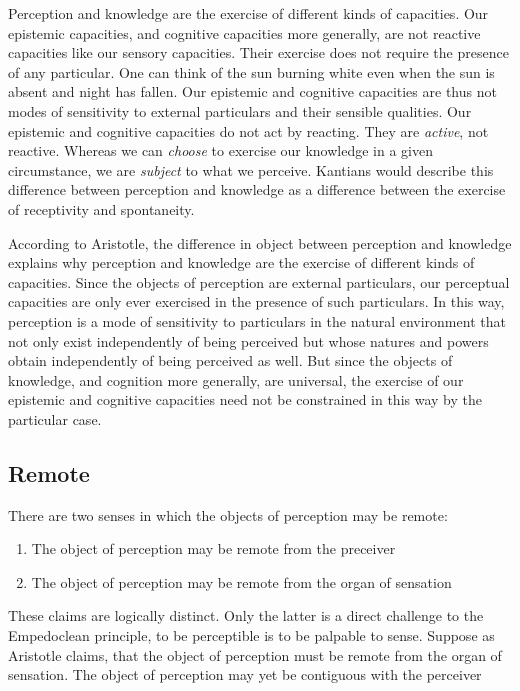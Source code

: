 Perception and knowledge are the exercise of different kinds of capacities. Our epistemic capacities, and cognitive capacities more generally, are not reactive capacities like our sensory capacities. Their exercise does not require the presence of any particular. One can think of the sun burning white even when the sun is absent and night has fallen. Our epistemic and cognitive capacities are thus not modes of sensitivity to external particulars and their sensible qualities. Our epistemic and cognitive capacities do not act by reacting. They are \emph{active}, not reactive. Whereas we can \emph{choose} to exercise our knowledge in a given circumstance, we are \emph{subject} to what we perceive. Kantians would describe this difference between perception and knowledge as a difference between the exercise of receptivity and spontaneity.

According to Aristotle, the difference in object between perception and know\-ledge explains why perception and knowledge are the exercise of different kinds of capacities. Since the objects of perception are external particulars, our perceptual capacities are only ever exercised in the presence of such particulars. In this way, perception is a mode of sensitivity to particulars in the natural environment that not only exist independently of being perceived but whose natures and powers obtain independently of being perceived as well. But since the objects of knowledge, and cognition more generally, are universal, the exercise of our epistemic and cognitive capacities need not be constrained in this way by the particular case.


\subsection{Remote} %
\label{sub:remote}

There are two senses in which the objects of perception may be remote:
\begin{enumerate}[(1)]
	\item The object of perception may be remote from the preceiver
	\item The object of perception may be remote from the organ of sensation
\end{enumerate}
These claims are logically distinct. Only the latter is a direct challenge to the Empedoclean principle, to be perceptible is to be palpable to sense. Suppose as Aristotle claims, that the object of perception must be remote from the organ of sensation. The object of perception may yet be contiguous with the perceiver

